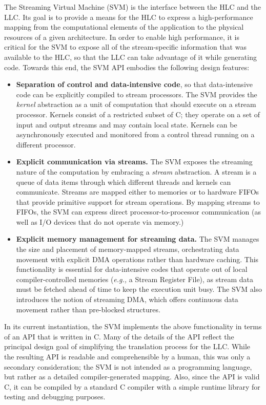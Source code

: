 The Streaming Virtual Machine (SVM) is the interface between the HLC
and the LLC.  Its goal is to provide a means for the HLC to express a
high-performance mapping from the computational elements of the
application to the physical resources of a given architecture.  In
order to enable high performance, it is critical for the SVM to expose
all of the stream-specific information that was available to the HLC,
so that the LLC can take advantage of it while generating code.
Towards this end, the SVM API embodies the following design features:
\begin{itemize}

\item {\bf Separation of control and data-intensive code}, so that
data-intensive code can be explicitly compiled to stream processors.
The SVM provides the {\it kernel} abstraction as a unit of computation
that should execute on a stream processor.  Kernels consist of a
restricted subset of C; they operate on a set of input and output
streams and may contain local state.  Kernels can be asynchronously
executed and monitored from a control thread running on a different
processor.

\item {\bf Explicit communication via streams.}  The SVM exposes the
streaming nature of the computation by embracing a {\it stream}
abstraction.  A stream is a queue of data items through which
different threads and kernels can communicate.  Streams are mapped
either to memories or to hardware FIFOs that provide primitive support
for stream operations.  By mapping streams to FIFOs, the SVM can
express direct processor-to-processor communication (as well as I/O
devices that do not operate via memory.)

\item {\bf Explicit memory management for streaming data.}  The SVM
manages the size and placement of memory-mapped streams, orchestrating
data movement with explicit DMA operations rather than hardware
caching.  This functionality is essential for data-intensive codes
that operate out of local compiler-controlled memories ({\it e.g.,} a
Stream Register File), as stream data must be fetched ahead of time to
keep the execution unit busy.  The SVM also introduces the notion of
streaming DMA, which offers continuous data movement rather than
pre-blocked structures.

\end{itemize} 
In its current instantiation, the SVM implements the above
functionality in terms of an API that is written in C.  Many of the
details of the API reflect the principal design goal of simplifying
the translation process for the LLC.  While the resulting API is
readable and comprehensible by a human, this was only a secondary
consideration; the SVM is not intended as a programming language, but
rather as a detailed compiler-generated mapping.  Also, since the API
is valid C, it can be compiled by a standard C compiler with a simple
runtime library for testing and debugging purposes.

